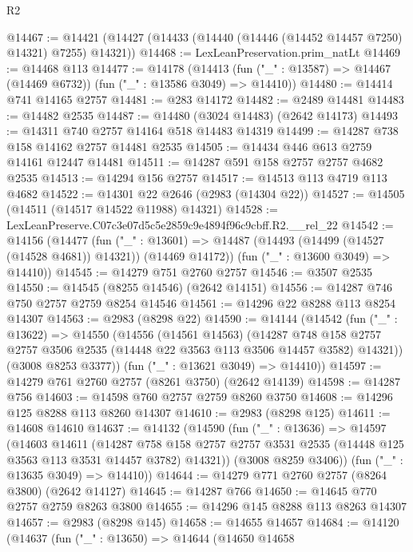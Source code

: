 \begin{lexlean}{R2}
\begin{coremodule}
@14467 := @14421 (@14427 (@14433 (@14440 (@14446 (@14452 @14457 @7250) @14321) @7255) @14321))
@14468 := LexLeanPreservation.prim_natLt
@14469 := @14468 @113
@14477 := @14178
    (@14413 (fun ("_" : @13587) => @14467 (@14469 @6732)) (fun ("_" : @13586 @3049) => @14410))
@14480 := @14414 @741 @14165 @2757
@14481 := @283 @14172
@14482 := @2489 @14481
@14483 := @14482 @2535
@14487 := @14480 (@3024 @14483) (@2642 @14173)
@14493 := @14311 @740 @2757 @14164 @518 @14483 @14319
@14499 := @14287 @738 @158 @14162 @2757 @14481 @2535
@14505 := @14434 @446 @613 @2759 @14161 @12447 @14481
@14511 := @14287 @591 @158 @2757 @2757 @4682 @2535
@14513 := @14294 @156 @2757
@14517 := @14513 @113 @4719 @113 @4682
@14522 := @14301 @22 @2646 (@2983 (@14304 @22))
@14527 := @14505 (@14511 (@14517 @14522 @11988) @14321)
@14528 := LexLeanPreserve.C07c3e07d5c5e2859c9e4894f96c9cbff.R2.__rel_22
@14542 := @14156
    (@14477
      (fun ("_" : @13601) =>
      @14487 (@14493 (@14499 (@14527 (@14528 @4681)) @14321)) (@14469 @14172))
      (fun ("_" : @13600 @3049) => @14410))
@14545 := @14279 @751 @2760 @2757
@14546 := @3507 @2535
@14550 := @14545 (@8255 @14546) (@2642 @14151)
@14556 := @14287 @746 @750 @2757 @2759 @8254 @14546
@14561 := @14296 @22 @8288 @113 @8254 @14307
@14563 := @2983 (@8298 @22)
@14590 := @14144
    (@14542
      (fun ("_" : @13622) =>
      @14550
        (@14556
          (@14561 @14563)
          (@14287
            @748
            @158
            @2757
            @2757
            @3506
            @2535
            (@14448 @22 @3563 @113 @3506 @14457 @3582)
            @14321))
        (@3008 @8253 @3377))
      (fun ("_" : @13621 @3049) => @14410))
@14597 := @14279 @761 @2760 @2757 (@8261 @3750) (@2642 @14139)
@14598 := @14287 @756
@14603 := @14598 @760 @2757 @2759 @8260 @3750
@14608 := @14296 @125 @8288 @113 @8260 @14307
@14610 := @2983 (@8298 @125)
@14611 := @14608 @14610
@14637 := @14132
    (@14590
      (fun ("_" : @13636) =>
      @14597
        (@14603
          @14611
          (@14287
            @758
            @158
            @2757
            @2757
            @3531
            @2535
            (@14448 @125 @3563 @113 @3531 @14457 @3782)
            @14321))
        (@3008 @8259 @3406))
      (fun ("_" : @13635 @3049) => @14410))
@14644 := @14279 @771 @2760 @2757 (@8264 @3800) (@2642 @14127)
@14645 := @14287 @766
@14650 := @14645 @770 @2757 @2759 @8263 @3800
@14655 := @14296 @145 @8288 @113 @8263 @14307
@14657 := @2983 (@8298 @145)
@14658 := @14655 @14657
@14684 := @14120
    (@14637
      (fun ("_" : @13650) =>
      @14644
        (@14650
          @14658

\end{coremodule}
\end{lexlean}
